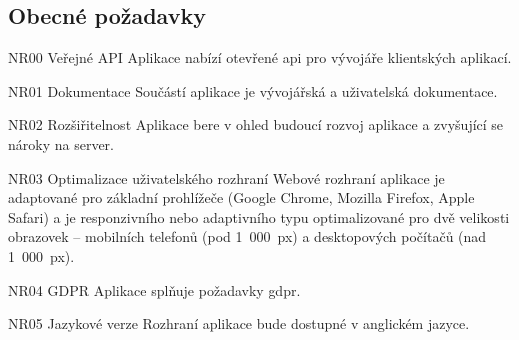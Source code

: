 \subsection{Obecné požadavky}

\begin{dl}
   \item[NR00 Veřejné API]
   Aplikace nabízí otevřené \gls{api} pro vývojáře klientských aplikací.

   \item[NR01 Dokumentace]
   Součástí aplikace je vývojářská a uživatelská dokumentace.

   \item[NR02 Rozšiřitelnost]
   Aplikace bere v ohled budoucí rozvoj aplikace a zvyšující se nároky na server.

   \item[NR03 Optimalizace uživatelského rozhraní]
   Webové rozhraní aplikace je adaptované pro základní prohlížeče (Google Chrome, Mozilla Firefox, Apple Safari) a je responzivního nebo adaptivního typu optimalizované pro dvě velikosti obrazovek -- mobilních telefonů (pod 1~000~px) a desktopových počítačů (nad 1~000~px).

   \item[NR04 GDPR] 
   Aplikace splňuje požadavky \gls{gdpr}.

   \item[NR05 Jazykové verze] 
   Rozhraní aplikace bude dostupné v anglickém jazyce.
\end{dl}
\newpage
